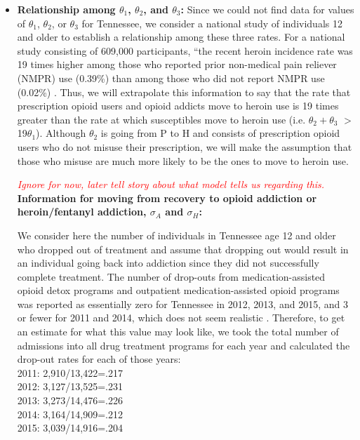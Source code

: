 \documentclass[12pt]{article}
\begin{document}
\begin{itemize}
\item \textbf{Relationship among $\theta_1$, $\theta_2$, and $\theta_3$:} Since we could not find data for values of $\theta_1$, $\theta_2$, or $\theta_3$ for Tennessee, we consider a national study of individuals 12 and older to establish a relationship among these three rates. For a national study consisting of 609,000 participants, ``the recent heroin incidence rate was 19 times higher among those who reported prior non-medical pain reliever (NMPR) use (0.39\%) than among those who did not report NMPR use (0.02\%) \cite{Muhuri}.
Thus, we will extrapolate this information to say that the rate that prescription opioid users and opioid addicts move to heroin use is 19 times greater than the rate at which susceptibles move to heroin use (i.e. $\theta_2 + \theta_3$ $>$ 19$\theta_1$). Although $\theta_2$ is going from P to H and consists of prescription opioid users who do not misuse their prescription, we will make the assumption that those who misuse are much more likely to be the ones to move to heroin use. \\
\pagebreak

\textcolor{red}{\emph{Ignore for now, later tell story about what model tells us regarding this.}} \\
\textbf{Information for moving from recovery to opioid addiction or heroin/fentanyl addiction, $\sigma_A$ and $\sigma_H$:} 

We consider here the number of individuals in Tennessee age 12 and older who dropped out of treatment and assume that dropping out would result in an individual going back into addiction since they did not successfully complete treatment. The number of drop-outs from medication-assisted opioid detox programs and outpatient medication-assisted opioid programs was reported as essentially zero for Tennessee in 2012, 2013, and 2015, and 3 or fewer for 2011 and 2014, which does not seem realistic \cite{TEDS2011_SAMSHA_discharges, TEDS2012_SAMSHA_discharges, TEDS2013_SAMSHA_discharges, TEDS2014_SAMSHA_discharges, TEDS2015_SAMSHA_discharges}. Therefore, to get an estimate for what this value may look like, we took the total number of admissions into all drug treatment programs for each year and calculated the drop-out rates for each of those years: \\
2011: 2,910/13,422=.217  \cite{TEDS2011_SAMSHA_admissions,TEDS2011_SAMSHA_discharges} \\
2012: 3,127/13,525=.231 \cite{TEDS2012_SAMSHA_admissions, TEDS2012_SAMSHA_discharges} \\
2013: 3,273/14,476=.226 \cite{TEDS2013_SAMSHA_admissions, TEDS2013_SAMSHA_discharges} \\
2014: 3,164/14,909=.212  \cite{TEDS2014_SAMSHA_admissions, TEDS2014_SAMSHA_discharges} \\
2015:  3,039/14,916=.204 \cite{TEDS2015_SAMSHA_admissions, TEDS2015_SAMSHA_discharges} \\


\end{itemize}
\end{document}
